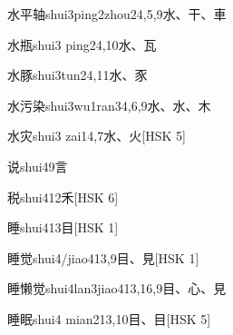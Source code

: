 \begin{EntryWithPhonetic}{水平轴}{shui3ping2zhou2}{4,5,9}{⽔、⼲、⾞}
\end{EntryWithPhonetic}

\begin{EntryWithPhonetic}{水瓶}{shui3 ping2}{4,10}{⽔、⽡}
\end{EntryWithPhonetic}

\begin{EntryWithPhonetic}{水豚}{shui3tun2}{4,11}{⽔、⾗}
\end{EntryWithPhonetic}

\begin{EntryWithPhonetic}{水污染}{shui3wu1ran3}{4,6,9}{⽔、⽔、⽊}
\end{EntryWithPhonetic}

\begin{EntryWithPhonetic}{水灾}{shui3 zai1}{4,7}{⽔、⽕}[HSK 5]
\end{EntryWithPhonetic}

\begin{EntryWithPhonetic}{说}{shui4}{9}{⾔}
\end{EntryWithPhonetic}

\begin{EntryWithPhonetic}{税}{shui4}{12}{⽲}[HSK 6]
\end{EntryWithPhonetic}

\begin{EntryWithPhonetic}{睡}{shui4}{13}{⽬}[HSK 1]
\end{EntryWithPhonetic}

\begin{EntryWithPhonetic}{睡觉}{shui4/jiao4}{13,9}{⽬、⾒}[HSK 1]
\end{EntryWithPhonetic}

\begin{EntryWithPhonetic}{睡懒觉}{shui4lan3jiao4}{13,16,9}{⽬、⼼、⾒}
\end{EntryWithPhonetic}

\begin{EntryWithPhonetic}{睡眠}{shui4 mian2}{13,10}{⽬、⽬}[HSK 5]
\end{EntryWithPhonetic}

